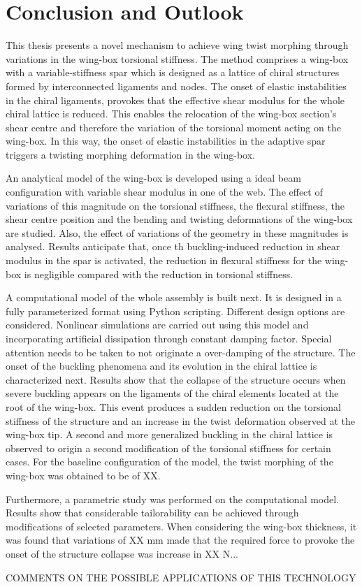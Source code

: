 \chapter{Conclusion and Outlook} \label{chap:summary}
%
%

This thesis presents a novel mechanism to achieve wing twist morphing through variations in the wing-box torsional stiffness. The method comprises a wing-box with a variable-stiffness spar which is designed as a lattice of chiral structures formed by interconnected ligaments and nodes. The onset of elastic instabilities in the chiral ligaments, provokes that the effective shear modulus for the whole chiral lattice is reduced. This enables the relocation of the wing-box section's shear centre and therefore the variation of the torsional moment acting on the wing-box. In this way, the onset of elastic instabilities in the adaptive spar triggers a twisting morphing deformation in the wing-box.

An analytical model of the wing-box is developed using a ideal beam configuration with variable shear modulus in one of the web. The effect of variations of this magnitude on the torsional stiffness, the flexural stiffness, the shear centre position and the bending and twisting deformations of the wing-box are studied. Also, the effect of variations of the geometry in these magnitudes is analysed. Results anticipate that, once th buckling-induced reduction in shear modulus in the spar is activated, the reduction in flexural stiffness for the wing-box is negligible compared with the reduction in torsional stiffness. 

A computational model of the whole assembly is built next. It is designed in a fully parameterized format using Python scripting. Different design options are considered. Nonlinear simulations are carried out using this model and incorporating artificial dissipation through constant damping factor. Special attention needs to be taken to not originate a over-damping of the structure. The onset of the buckling phenomena and its evolution in the chiral lattice is characterized next. Results show that the collapse of the structure occurs when severe buckling appears on the ligaments of the chiral elements located at the root of the wing-box. This event produces a sudden reduction on the torsional stiffness of the structure and an increase in the twist deformation observed at the wing-box tip. A second and more generalized buckling in the chiral lattice is observed to origin a second modification of the torsional stiffness for certain cases. For the baseline configuration of the model, the twist morphing of the wing-box was obtained to be of XX.

Furthermore, a parametric study was performed on the computational model. Results show that considerable tailorability can be achieved through modifications of selected parameters. When considering the wing-box thickness, it was found that variations of XX mm made that the required force to provoke the onset of the structure collapse was increase in XX N...

COMMENTS ON THE POSSIBLE APPLICATIONS OF THIS TECHNOLOGY

